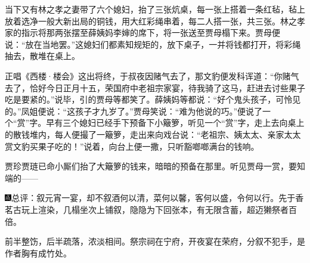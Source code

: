 当下又有林之孝之妻带了六个媳妇，抬了三张炕桌，每一张上搭着一条红毡，毡上放着选净一般大新出局的铜钱，用大红彩绳串着，每二人搭一张，共三张。林之孝家的指示将那两张摆至薛姨妈李婶的席下，将一张送至贾母榻下来。贾母便说：``放在当地罢。''这媳妇们都素知规矩的，放下桌子，一并将钱都打开，将彩绳抽去，散堆在桌上。

正唱《西楼·楼会》这出将终，于叔夜因赌气去了，那文豹便发科诨道：``你赌气去了，恰好今日正月十五，荣国府中老祖宗家宴，待我骑了这马，赶进去讨些果子吃是要紧的。''说毕，引的贾母等都笑了。薛姨妈等都说：``好个鬼头孩子，可怜见的。''凤姐便说：``这孩子才九岁了。''贾母笑说：``难为他说的巧。''便说了一个``赏''字。早有三个媳妇已经手下预备下小簸箩，听见一个``赏''字，走上去向桌上的散钱堆内，每人便撮了一簸箩，走出来向戏台说：``老祖宗、姨太太、亲家太太赏文豹买果子吃的！''说着，向台上便一撒，只听豁啷啷满台的钱响。

贾珍贾琏已命小厮们抬了大簸箩的钱来，暗暗的预备在那里。听见贾母一赏，要知端的------

{\includegraphics[width=3mm]{../Images/00005}总评：叙元宵一宴，却不叙酒何以清，菜何以馨，客何以盛，令何以行。先于香茗古玩上渲染，几榻坐次上铺叙，隐隐为下回张本，有无限含蓄，超迈獭祭者百倍。}

{前半整饬，后半疏落，浓淡相间。祭宗祠在宁府，开夜宴在荣府，分叙不犯手，是作者胸有成竹处。}

